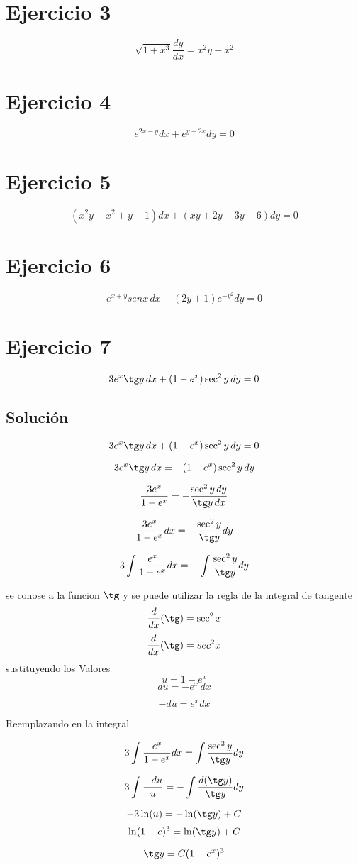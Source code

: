 \documentclass[12pt,a4paper]{article}
\begin{document}
\begin{multicols}{2}
\section*{Ejercicio 3}
\[\sqrt{1+x^3}\frac{dy}{dx}=x^2y+x^2 \]

\section*{Ejercicio 4}
\[e^{2x-y}dx+e^{y-2x}dy=0\]

\section*{Ejercicio 5}
\[(x^2y-x^2+y-1)dx+(xy+2y-3y-6)dy=0\]

\section*{Ejercicio 6}
\[e^{x+y}senx \, dx+(2y+1)e^{-y^2}dy=0\]


\section*{Ejercicio 7} \[3e^x\tg y \, dx+(1-e^x)\sec^2 y \, dy=0\] 
\subsection*{Solución} 
\[3e^x\tg y \, dx+(1-e^x)\sec^2 y \, dy=0\] 

\[3e^x\tg y\,dx=-(1-e^x)\sec^2 y\,dy\] 

\[\frac{3e^x}{1-e^x}=-\frac{\sec^2 y\,dy}{\tg y\,dx}\] 

\[\frac{3e^x}{1-e^x}dx=-\frac{\sec^2 y}{\tg y}dy\] 

\[3\int\frac{e^x}{1-e^x}dx=-\int\frac{\sec^2 y}{\tg y}dy\]  

se conose a la funcion $\tg$ y se puede utilizar la regla de la integral de tangente \[\frac{d}{dx}(\tg)=\sec^2x\]
\[\frac{d}{dx}(\tg)=sec^2x\] 
sustituyendo los Valores \[u=1-e^x\] \[du=-e^x\,dx\] 

\[-du=e^xdx\]

Reemplazando en la integral 

\[3\int\frac{e^x}{1-e^x}dx=\int\frac{\sec^2 y}{\tg y}dy\] 

\[3\int\frac{-du}{u}=-\int\frac{d(\tg y)}{\tg y}dy\] 

\[-3\ln(u)=-\ln(\tg y)+C\] \[\ln(1-e)^3=\ln(\tg y)+C\] 

\[\tg y=C(1-e^x)^3\] 


\end{multicols}
\end{document}
